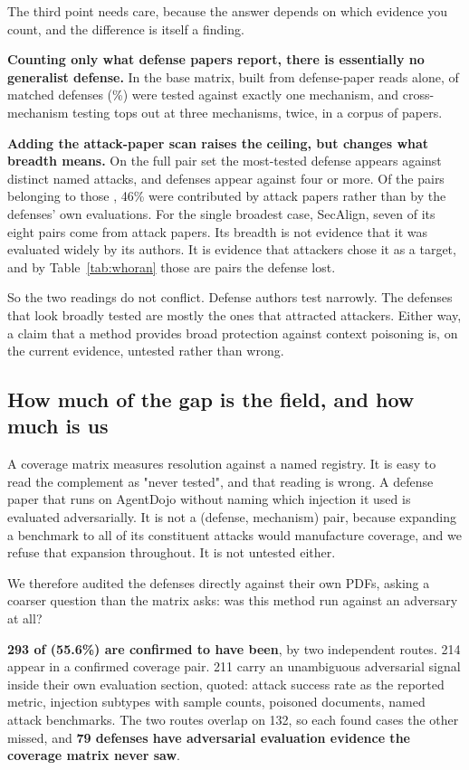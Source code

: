 The third point needs care, because the answer depends on which evidence you
count, and the difference is itself a finding.

\textbf{Counting only what defense papers report, there is essentially no
generalist defense.} In the base matrix, built from defense-paper reads alone,
\NDefOneBase{} of \NDefMatchedBase{} matched defenses (\PctDefOneBase{}\%)
were tested against exactly one mechanism,
and cross-mechanism testing tops out at three mechanisms, twice, in a corpus
of \NCorpus{} papers.

\textbf{Adding the attack-paper scan raises the ceiling, but changes what
breadth means.} On the full pair set the most-tested defense appears against
\NDefCeiling{} distinct named attacks, and \NDefFourPlus{} defenses appear
against four or more. Of the pairs belonging to those \NDefFourPlus{}, 46\% were contributed by attack papers rather
than by the defenses' own evaluations. For the single broadest case, SecAlign,
seven of its eight pairs come from attack papers. Its breadth is not evidence
that it was evaluated widely by its authors. It is evidence that attackers
chose it as a target, and by Table~\ref{tab:whoran} those are pairs the defense
lost.

So the two readings do not conflict. Defense authors test narrowly. The
defenses that look broadly tested are mostly the ones that attracted attackers.
Either way, a claim that a method provides broad protection against context
poisoning is, on the current evidence, untested rather than wrong.

\subsection{How much of the gap is the field, and how much is us}

A coverage matrix measures resolution against a named registry. It is easy to
read the complement as "never tested", and that reading is wrong. A defense
paper that runs on AgentDojo without naming which injection it used is
evaluated adversarially. It is not a (defense, mechanism) pair, because
expanding a benchmark to all of its constituent attacks would manufacture
coverage, and we refuse that expansion throughout. It is not untested either.

We therefore audited the \NDefenses{} defenses directly against their own
PDFs, asking a coarser question than the matrix asks: was this method run
against an adversary at all?

\textbf{293 of \NDefenses{} (55.6\%) are confirmed to have been}, by two
independent routes. 214 appear in a confirmed coverage pair. 211 carry an
unambiguous adversarial signal inside their own evaluation section, quoted:
attack success rate as the reported metric, injection subtypes with sample
counts, poisoned documents, named attack benchmarks. The two routes overlap on
132, so each found cases the other missed, and \textbf{79 defenses have
adversarial evaluation evidence the coverage matrix never saw}.

